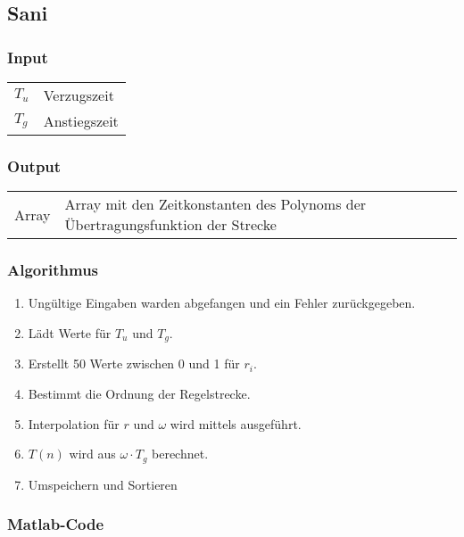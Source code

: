 \subsection{Sani}
\label{app:sani}

\subsubsection*{Input}

\begin{tabular}{p{40mm}l}
    $ T_u $ & Verzugszeit \\
    $ T_g $ & Anstiegszeit
\end{tabular}

\subsubsection*{Output}
\begin{tabular}{p{40mm}l}
    Array & \parbox[t][4em][s]{0.7\textwidth}{Array mit den Zeitkonstanten des Polynoms der \"Ubertragungsfunktion der Strecke}
\end{tabular}

\subsubsection*{Algorithmus}
\begin{enumerate}
    \item
        Ung\"ultige Eingaben warden abgefangen und ein Fehler zur\"uckgegeben.
    \item
        L\"adt Werte f\"ur $T_u$ und $T_g$.
    \item
        Erstellt 50 Werte zwischen 0 und 1 f\"ur $r_i$.
    \item
        Bestimmt die Ordnung der Regelstrecke.
    \item
        Interpolation  f\"ur $r$  und  $\omega$  wird mittels  
        ausgef\"uhrt.
    \item
        $T(n)$ wird aus $\omega \cdot T_g$ berechnet.
    \item
        Umspeichern und Sortieren
\end{enumerate}

\clearpage
\subsubsection*{Matlab-Code}



